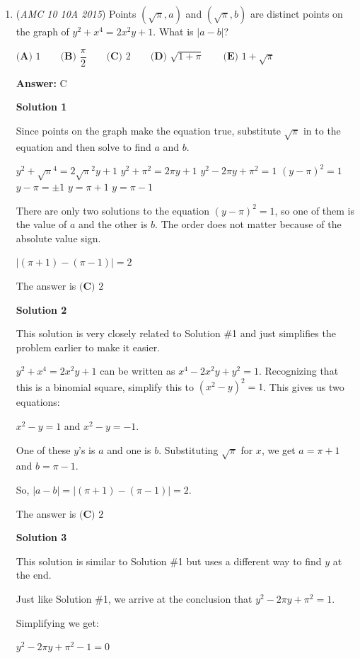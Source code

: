 \begin{enumerate}
	\item (\textit{AMC 10 10A 2015}) Points $(\sqrt{\pi}, a)$ and $(\sqrt{\pi}, b)$ are distinct points on the graph of $y^2+x^4=2x^2y+1$. What is $|a-b|$?


 $\textbf{(A) }1\qquad\textbf{(B) }\dfrac{\pi}{2}\qquad\textbf{(C) }2\qquad\textbf{(D) }\sqrt{1+\pi}\qquad\textbf{(E) }1+\sqrt{\pi}$

 \textbf{Answer: }C



\textbf{Solution 1}

Since points on the graph make the equation true, substitute $\sqrt{\pi}$ in to the equation and then solve to find $a$ and $b$.

 $y^2 + \sqrt{\pi}^4 = 2\sqrt{\pi}^2 y + 1$
$y^2 + \pi^2 = 2\pi y + 1$
$y^2 - 2\pi y + \pi^2 = 1$
$(y-\pi)^2 = 1$
$y-\pi = \pm 1$
$y = \pi + 1$
$y = \pi - 1$

 There are only two solutions to the equation $(y-\pi)^2 = 1$, so one of them is the value of $a$ and the other is $b$. The order does not matter because of the absolute value sign.

 $| (\pi + 1) - (\pi - 1) | = 2$

 The answer is $\boxed{\textbf{(C) }2}$




\textbf{Solution 2}

This solution is very closely related to Solution \#1 and just simplifies the problem earlier to make it easier.

 $y^2 + x^4 = 2x^2 y + 1$ can be written as $x^4-2x^2y+y^2=1$. Recognizing that this is a binomial square, simplify this to $(x^2-y)^2=1$. This gives us two equations:

 $x^2-y=1$ and $x^2-y=-1$.

 One of these $y$'s is $a$ and one is $b$. Substituting $\sqrt{\pi}$ for $x$, we get $a=\pi+1$ and $b=\pi-1$. 

 So, $|a-b|=|(\pi+1)-(\pi-1)|=2$.

 The answer is $\boxed{\textbf{(C) }2}$




\textbf{Solution 3}

This solution is similar to Solution \#1 but uses a different way to find $y$ at the end.

 Just like Solution \#1, we arrive at the conclusion that $y^2 - 2\pi y + \pi^2 = 1$.

 Simplifying we get:

 $y^2 - 2\pi y + \pi^2 -1 = 0$


\end{enumerate}
